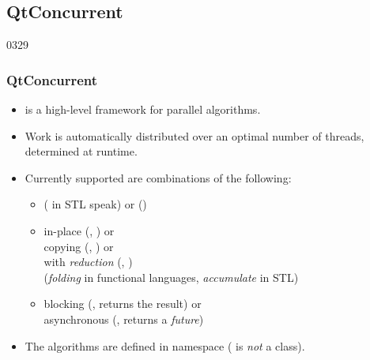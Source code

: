 %
%
%
%

\subsection{QtConcurrent}

\begin{slide}{0329}
\frametitle{QtConcurrent}\label{QtConcurrent}
  \begin{itemize}
  \item {} is a high-level framework for parallel algorithms.
  \item Work is automatically distributed over an optimal number of
    threads, determined at runtime.
  \item Currently supported are combinations of the following:
    \begin{itemize}
    \item {} ( in STL speak) or
       ()
    \item in-place (,
      ) or\\
      copying (, ) or\\
      with \emph{reduction} (, )\\
      (\emph{folding} in functional languages, \emph{accumulate} in STL)
    \item blocking (, returns the result) or\\
      asynchronous (, returns a \emph{future})
    \end{itemize}
  \item The algorithms are defined in namespace 
    ( is \emph{not} a class).
  \end{itemize}
\end{slide}

